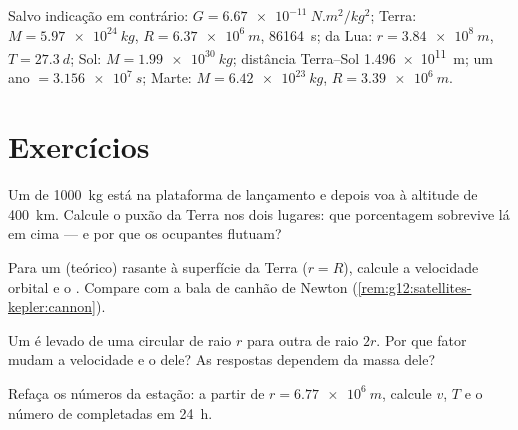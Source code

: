 \begin{remark}\label{rem:g12:satellites-kepler:data}
Salvo indicação em contrário: $G = \qty{6.67e-11}{N.m^2/kg^2}$; Terra:
$M = \qty{5.97e24}{kg}$, $R = \qty{6.37e6}{m}$,  \qty{86164}{s};  da
Lua: $r = \qty{3.84e8}{m}$, $T = \qty{27.3}{d}$; Sol: $M = \qty{1.99e30}{kg}$;
distância Terra--Sol \qty{1.496e11}{m}; um ano $= \qty{3.156e7}{s}$; Marte:
$M = \qty{6.42e23}{kg}$, $R = \qty{3.39e6}{m}$.
\end{remark}

\section{Exercícios}

\begin{exercise}[$\star$]\label{exo:g12:satellites-kepler:1}
Um  de \qty{1000}{kg} está na plataforma de lançamento e depois voa à altitude
de \qty{400}{km}. Calcule o puxão da Terra nos dois lugares: que porcentagem sobrevive
lá em cima --- e por que os ocupantes flutuam?
\end{exercise}

\begin{exercise}[$\star$]\label{exo:g12:satellites-kepler:2}
Para um  (teórico) rasante à superfície da Terra ($r = R$), calcule a
velocidade orbital e o . Compare com a bala de canhão de Newton
(\cref{rem:g12:satellites-kepler:cannon}).
\end{exercise}

\begin{exercise}[$\star$]\label{exo:g12:satellites-kepler:3}
Um  é levado de uma  circular de raio $r$ para outra de raio $2r$. Por
que fator mudam a velocidade e o  dele? As respostas dependem da massa dele?
\end{exercise}

\begin{exercise}[$\star$]\label{exo:g12:satellites-kepler:4}
Refaça os números da estação: a partir de $r = \qty{6.77e6}{m}$, calcule $v$, $T$ e o
número de  completadas em \qty{24}{h}.
\end{exercise}

